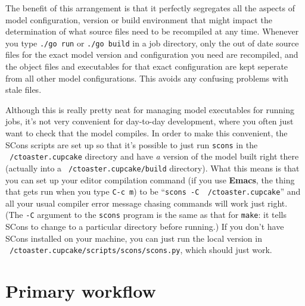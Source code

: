 \documentclass[a4paper,10pt,article]{memoir}
\begin{document}
The benefit of this arrangement is that it perfectly segregates all
the aspects of model configuration, version or build environment that
might impact the determination of what source files need to be
recompiled at any time.  Whenever you type \texttt{./go run} or
\texttt{./go build} in a job directory, only the out of date source
files for the exact model version and configuration you need are
recompiled, and the object files and executables for that exact
configuration are kept seperate from all other model configurations.
This avoids any confusing problems with stale files.

Although this is really pretty neat for managing model executables for
running jobs, it's not very convenient for day-to-day development,
where you often just want to check that the model compiles.  In order
to make this convenient, the SCons scripts are set up so that it's
possible to just run \texttt{scons} in the \texttt{~/ctoaster.cupcake} directory
and have \emph{a} version of the model built right there (actually
into a \texttt{~/ctoaster.cupcake/build} directory).  What this means is that
you can set up your editor compilation command (if you use \textbf{Emacs}, the
thing that gets run when you type \texttt{C-c m}) to be
``\texttt{scons -C ~/ctoaster.cupcake}'' and all your usual compiler error
message chasing commands will work just right.  (The \texttt{-C}
argument to the \texttt{scons} program is the same as that for
\texttt{make}: it tells SCons to change to a particular directory
before running.)  If you don't have SCons installed on your machine,
you can just run the local version in
\\\texttt{~/ctoaster.cupcake/scripts/scons/scons.py}, which should just work.

\section{Primary workflow}
\end{document}
